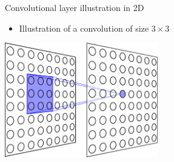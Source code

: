 \documentclass[xcolor=pdftex,dvipsnames,table,mathserif]{beamer}
\begin{document}
\begin{frame}{Convolutional layer illustration in 2D}


  \begin{itemize}
  \item Illustration of a convolution of size $3 \times 3$
  \end{itemize}

  \begin{center}
    \includegraphics[width=0.5\textwidth]{cnn_complet}
  \end{center}


\end{frame}
\end{document}
